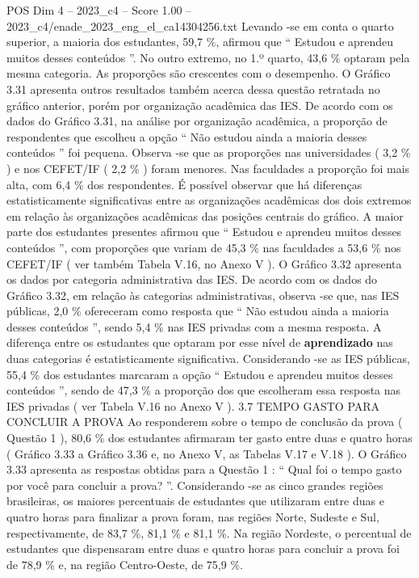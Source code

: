 \begin{textsample}{POS Dim 4 – 2023\_c4 – Score 1.00 – 2023\_c4/enade\_2023\_eng\_el\_ca14304256.txt}
Levando -se em conta o quarto superior, a maioria dos estudantes, 59,7 \%, afirmou que “ Estudou e aprendeu muitos desses conteúdos ”.
No outro extremo, no 1.º quarto, 43,6 \% optaram pela mesma categoria.
As proporções são crescentes com o desempenho.
O Gráfico 3.31 apresenta outros resultados também acerca dessa questão retratada no gráfico anterior, porém por organização acadêmica das IES.
De acordo com os dados do Gráfico 3.31, na análise por organização acadêmica, a proporção de respondentes que escolheu a opção “ Não estudou ainda a maioria desses conteúdos ” foi pequena.
Observa -se que as proporções nas universidades ( 3,2 \% ) e nos CEFET/IF ( 2,2 \% ) foram menores.
Nas faculdades a proporção foi mais alta, com 6,4 \% dos respondentes.
É possível observar que há diferenças estatisticamente significativas entre as organizações acadêmicas dos dois extremos em relação às organizações acadêmicas das posições centrais do gráfico.
A maior parte dos estudantes presentes afirmou que “ Estudou e aprendeu muitos desses conteúdos ”, com proporções que variam de 45,3 \% nas faculdades a 53,6 \% nos CEFET/IF ( ver também Tabela V.16, no Anexo V ).
O Gráfico 3.32 apresenta os dados por categoria administrativa das IES.
De acordo com os dados do Gráfico 3.32, em relação às categorias administrativas, observa -se que, nas IES públicas, 2,0 \% ofereceram como resposta que “ Não estudou ainda a maioria desses conteúdos ”, sendo 5,4 \% nas IES privadas com a mesma resposta.
A diferença entre os estudantes que optaram por esse nível de \textbf{aprendizado} nas duas categorias é estatisticamente significativa.
Considerando -se as IES públicas, 55,4 \% dos estudantes marcaram a opção “ Estudou e aprendeu muitos desses conteúdos ”, sendo de 47,3 \% a proporção dos que escolheram essa resposta nas IES privadas ( ver Tabela V.16 no Anexo V ). 3.7 TEMPO GASTO PARA CONCLUIR A PROVA Ao responderem sobre o tempo de conclusão da prova ( Questão 1 ), 80,6 \% dos estudantes afirmaram ter gasto entre duas e quatro horas ( Gráfico 3.33 a Gráfico 3.36 e, no Anexo V, as Tabelas V.17 e V.18 ).
O Gráfico 3.33 apresenta as respostas obtidas para a Questão 1 : “ Qual foi o tempo gasto por você para concluir a prova? ”.
Considerando -se as cinco grandes regiões brasileiras, os maiores percentuais de estudantes que utilizaram entre duas e quatro horas para finalizar a prova foram, nas regiões Norte, Sudeste e Sul, respectivamente, de 83,7 \%, 81,1 \% e 81,1 \%.
Na região Nordeste, o percentual de estudantes que dispensaram entre duas e quatro horas para concluir a prova foi de 78,9 \% e, na região Centro-Oeste, de 75,9 \%.

\end{textsample}
